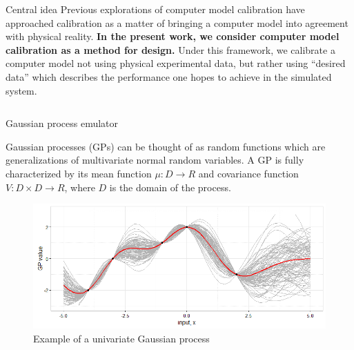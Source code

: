\documentclass[final]{beamer}
\newlength{\onecolwid}
\newlength{\twocolwid}
\begin{document}
\begin{frame}[t]
\begin{columns}[t]
\begin{column}{\twocolwid}
\begin{alertblock}{Central idea}
Previous explorations of computer model calibration have approached calibration as a matter of bringing a computer model into agreement with physical reality\cite{Bayarri2007,Kennedy2001,Higdon2004,Williams2006}. \textbf{In the present work, we consider computer model calibration as a method for design.} Under this framework, we calibrate a computer model not using physical experimental data, but rather using ``desired data'' which describes the performance one hopes to achieve in the simulated system. 

\end{alertblock} 


\begin{columns}[t,totalwidth=\twocolwid] %

\begin{column}{\onecolwid}\vspace{-.6in} %


\begin{alertblock}{Gaussian process emulator}

Gaussian processes (GPs) can be thought of as random functions which are generalizations of multivariate normal random variables\cite{OHagan1978}. A GP is fully characterized by its mean function $\mu:D\to R$ and covariance function $V:D\times D\to R$, where $D$ is the domain of the process.

\begin{figure}[h!]
\includegraphics[width=0.95\linewidth]{../../gp_example}
\caption{Example of a univariate Gaussian process}
\label{gp_ex}
\end{figure}




\end{alertblock}
\end{column}
\end{columns}
\end{column}
\end{columns}
\end{frame}
\end{document}
